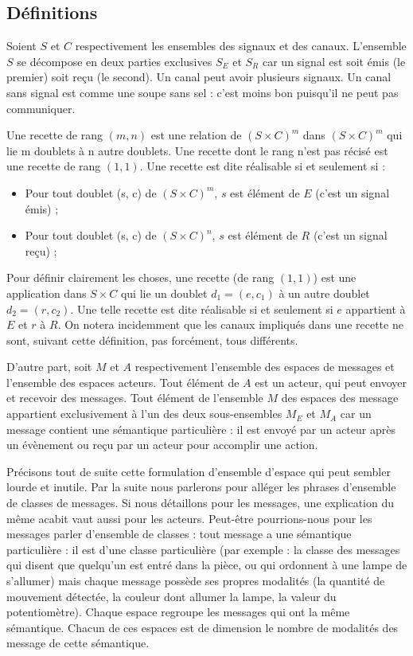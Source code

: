 \documentclass[11pt]{article}
\begin{document}
\subsection{Définitions}

Soient $S$ et $C$ respectivement les ensembles des signaux et des canaux. L'ensemble $S$ se décompose en deux parties exclusives $S_E$ et $S_R$ car un signal est soit émis (le premier) soit reçu (le second). Un canal peut avoir plusieurs signaux. Un canal sans signal est comme une soupe sans sel : c'est moins bon puisqu'il ne peut pas communiquer.

Une recette de rang $(m, n)$ est une relation de $\left(S×C\right)^m$ dans $\left(S×C\right)^m$ qui lie m doublets à n autre doublets. Une recette dont le rang n'est pas récisé est une recette de rang $(1, 1)$. Une recette est dite réalisable si et seulement si :
\begin{itemize}
\item Pour tout doublet (s, c) de $\left(S×C\right)^m$, $s$ est élément de $E$ (c'est un signal émis) ;
\item Pour tout doublet (s, c) de $\left(S×C\right)^n$, $s$ est élément de $R$ (c'est un signal reçu) ;
\end{itemize}
Pour définir clairement les choses, une recette (de rang $(1, 1)$) est une application dans $S×C$ qui lie un doublet $d_1 = (e, c_1)$ à un autre doublet $d_2 = (r, c_2)$. Une telle recette est dite réalisable si et seulement si $e$ appartient à $E$ et $r$ à $R$. On notera incidemment que les canaux impliqués dans une recette ne sont, suivant cette définition, pas forcément, tous différents.

D'autre part, soit $M$ et $A$ respectivement l'ensemble des espaces de messages et l'ensemble des espaces acteurs. Tout élément de $A$ est un acteur, qui peut envoyer et recevoir des messages. Tout élément de l'ensemble $M$ des espaces des message appartient exclusivement à l'un des deux sous-ensembles $M_E$ et $M_A$ car un message contient une sémantique particulière : il est envoyé par un acteur après un évènement ou reçu par un acteur pour accomplir une action.

Précisons tout de suite cette formulation d'\og ensemble d'espace \fg{} qui peut sembler lourde et inutile. Par la suite nous parlerons pour alléger les phrases d'ensemble de classes de messages. Si nous détaillons pour les messages, une explication du même acabit vaut aussi pour les acteurs. Peut-être pourrions-nous pour les messages parler d'ensemble de classes : tout message a une sémantique particulière : il est d'une classe particulière (par exemple : la classe des messages qui disent que quelqu'un est entré dans la pièce, ou qui ordonnent à une lampe de s'allumer) mais chaque message possède ses propres modalités (la quantité de mouvement détectée, la couleur dont allumer la lampe, la valeur du potentiomètre). Chaque espace regroupe les messages qui ont la même sémantique. Chacun de ces espaces est de dimension le nombre de modalités des message de cette sémantique.
\end{document}
